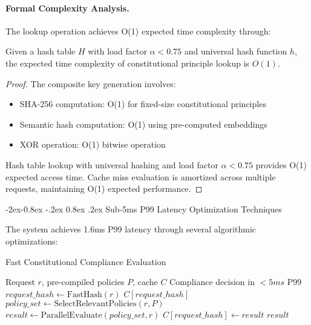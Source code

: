 \documentclass[manuscript,screen,9pt]{acmart}
\makeatletter
\renewcommand\subsubsection{\@startsection{subsubsection}{3}{\z@}%
  {-2ex\@plus -0.8ex \@minus -.2ex}%
  {0.8ex \@plus .2ex}%
  {\normalfont\normalsize\bfseries}}
\makeatother
\begin{document}
\begin{table}[!htb]
\paragraph{Formal Complexity Analysis.} The lookup operation achieves O(1) expected time complexity through:

\begin{theorem}
Given a hash table $H$ with load factor $\alpha < 0.75$ and universal hash function $h$, the expected time complexity of constitutional principle lookup is $O(1)$.
\end{theorem}

\begin{proof}
The composite key generation involves:
\begin{itemize}
    \item SHA-256 computation: O(1) for fixed-size constitutional principles
    \item Semantic hash computation: O(1) using pre-computed embeddings
    \item XOR operation: O(1) bitwise operation
\end{itemize}
Hash table lookup with universal hashing and load factor $\alpha < 0.75$ provides O(1) expected access time. Cache miss evaluation is amortized across multiple requests, maintaining O(1) expected performance.
\end{proof}

\subsubsection{Sub-5ms P99 Latency Optimization Techniques}

The system achieves 1.6ms P99 latency through several algorithmic optimizations:

\begin{algorithm}[H]
\caption{Fast Constitutional Compliance Evaluation}
\label{alg:fast_compliance}
\begin{algorithmic}[1]
\Require Request $r$, pre-compiled policies $P$, cache $C$
\Ensure Compliance decision in $< 5ms$ P99
\State $request\_hash \leftarrow \text{FastHash}(r)$
    \State \Return $C[request\_hash]$ 
\EndIf
\State $policy\_set \leftarrow \text{SelectRelevantPolicies}(r, P)$
\State $result \leftarrow \text{ParallelEvaluate}(policy\_set, r)$
\State $C[request\_hash] \leftarrow result$
\State \Return $result$
\end{algorithmic}
\end{algorithm}


\end{table}
\end{document}
